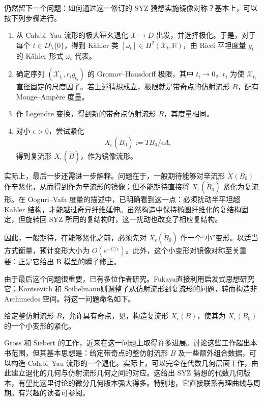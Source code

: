 仍然留下一个问题：如何通过这一修订的 SYZ 猜想实施镜像对称？基本上，可以按下列步骤进行。
\begin{enumerate}
\item 从 Calabi--Yau 流形的极大幂幺退化 $\mathcal X\to D$ 出发，并选择极化。于是，对于每个 $t\in D\setminus\{0\}$，得到 Kähler 类 $[\omega_t]\in H^2(\mathcal X_t,\mathbb R)$，由 Ricci 平坦度量 $g_t$ 的 Kähler 形式 $\omega_t$ 代表。
\item 确定序列 $(\mathcal X_{t_i},r_ig_{t_i})$ 的 Gromov--Hausdorff 极限，其中 $t_i\to0$，$r_i$ 为使 $\mathcal X_{t_i}$ 直径固定的尺度因子。若上述猜想成立，极限就是带奇点的仿射流形 $B$，配有 Monge--Ampère 度量。
\item 作 Legendre 变换，得到新的带奇点仿射流形 $\check B$，其度量相同。
\item 对小 $\epsilon>0$，尝试紧化
\[
X_\epsilon(\check B_0):=T\check B_0/\epsilon\Lambda,
\]
得到复流形 $X_\epsilon(\check B)$，作为镜像流形。
\end{enumerate}

实际上，最后一步还需进一步解释。问题在于，一般期待能够对辛流形 $\check X(B_0)$ 作辛紧化，从而得到作为辛流形的镜像；但不能期待直接将 $X_\epsilon(\check B_0)$ 紧化为复流形。在 Ooguri--Vafa 度量的描述中，已明确看到这一点：必须扰动半平坦超 Kähler 结构，才能越过奇异纤维延伸。虽然构造中保持椭圆纤维化的复结构固定，但旋转回 SYZ 所用的复结构时，这一扰动也改变了相应复结构。

因此，一般期待，在能够紧化之前，必须先对 $X_\epsilon(\check B_0)$ 作一个“小”变形。以适当方式衡量，预计变形大小为 $O(e^{-C/\epsilon})$。此外，这个小变形对镜像对称至关重要：正是它给出 B 模型的瞬子修正。

由于最后这个问题很重要，已有多位作者研究。Fukaya直接利用启发式思想研究它；Kontsevich 和 Soibelmann则调整了从仿射流形到复流形的问题，转而构造非 Archimedes 空间。将这一问题命名如下。
\begin{problem}[重构问题]\label{prob:7.34}
给定整仿射流形 $B$，允许具有奇点，见，构造复流形 $X_\epsilon(B)$，使其为 $X_\epsilon(B_0)$ 的一个小变形的紧化。
\end{problem}

Gross 和 Siebert 的工作，近来在这一问题上取得许多进展。讨论这些工作超出本书范围，但其基本思想是：给定带奇点的整仿射流形 $B$ 及一些额外组合数据，可以构造 Calabi--Yau 流形的一个退化。实际上，可以完全在代数几何层面工作，由此建立退化的几何与仿射流形几何之间的对应。这给出 SYZ 猜想的代数几何版本，有望比这里讨论的微分几何版本强大得多。特别地，它直接联系有理曲线与周期。有兴趣的读者可参阅。
